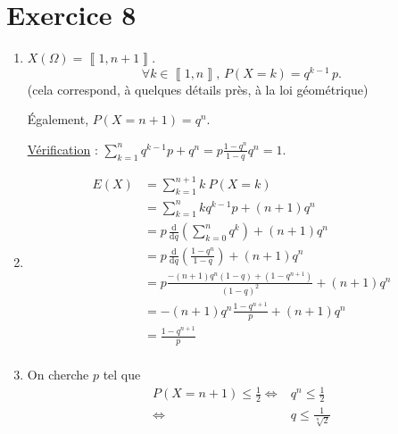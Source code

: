 \part{Exercice 8}

\begin{enumerate}
	\item $X(\Omega) = \left\llbracket 1,n+1 \right\rrbracket$.
		\[
			\forall k \in \left\llbracket 1,n \right\rrbracket,\, P(X=k) = q^{k-1}\,p
		.\] (cela correspond, à quelques détails près, à la loi géométrique)

		Également, $P(X = n+1) = q^{n}$.

		\underline{Vérification} : $\sum_{k=1}^n q^{k-1} p + q^{n} = p \frac{1-q^n}{1-q} q^n = 1$.
	\item
		\begin{align*}
			E(X) &= \sum_{k=1}^{n+1} k\:P(X = k)\\
			&= \sum_{k=1}^n k q^{k-1} p + (n+1)q^n \\
			&= p\,\frac{\mathrm{d}}{\mathrm{d}q}\left( \sum_{k=0}^n q^k \right) + (n+1)q^n \\
			&= p\, \frac{\mathrm{d}}{\mathrm{d}q}\left( \frac{1-q^{n}}{1-q} \right) + (n+1)q^n \\
			&= p \frac{-(n+1)q^n (1-q) + (1-q^{n+1})}{(1-q)^2} + (n+1)q^n \\
			&= -(n+1)q^n \frac{1-q^{n+1}}{p} + (n+1)q^n \\
			&= \frac{1-q^{n+1}}{p} \\
		\end{align*}
	\item On cherche $p$ tel que
		\begin{align*}
			P(X = n+1) \le \frac{1}{2} \iff& q^n \le \frac{1}{2}\\
			\iff& q \le \frac{1}{\sqrt[n]{2}}
		\end{align*}
\end{enumerate}

